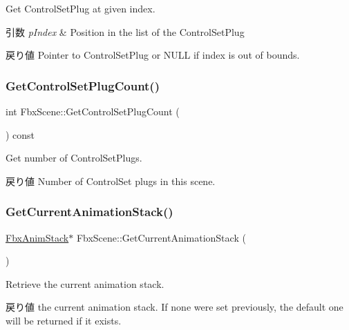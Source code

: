Get Control\+Set\+Plug at given index. 
\begin{DoxyParams}{引数}
{\em p\+Index} & Position in the list of the Control\+Set\+Plug \\
\hline
\end{DoxyParams}
\begin{DoxyReturn}{戻り値}
Pointer to Control\+Set\+Plug or {\ttfamily N\+U\+LL} if index is out of bounds. 
\end{DoxyReturn}
\mbox{\label{class_fbx_scene_a03a1a3f0153d9aa882eaa9c550fd9127}} 
\subsubsection{\texorpdfstring{Get\+Control\+Set\+Plug\+Count()}{GetControlSetPlugCount()}}
{\footnotesize\ttfamily int Fbx\+Scene\+::\+Get\+Control\+Set\+Plug\+Count (\begin{DoxyParamCaption}{ }\end{DoxyParamCaption}) const}

Get number of Control\+Set\+Plugs. \begin{DoxyReturn}{戻り値}
Number of Control\+Set plugs in this scene. 
\end{DoxyReturn}
\mbox{\label{class_fbx_scene_af8fde6643714a5e654e1e28d6f5470f9}} 
\subsubsection{\texorpdfstring{Get\+Current\+Animation\+Stack()}{GetCurrentAnimationStack()}}
{\footnotesize\ttfamily \hyperlink{class_fbx_anim_stack}{Fbx\+Anim\+Stack}$\ast$ Fbx\+Scene\+::\+Get\+Current\+Animation\+Stack (\begin{DoxyParamCaption}{ }\end{DoxyParamCaption})}

Retrieve the current animation stack. \begin{DoxyReturn}{戻り値}
the current animation stack. If none were set previously, the default one will be returned if it exists. 
\end{DoxyReturn}
\mbox{\label{class_fbx_scene_a7dd5c89cc0d60a42ce504b2593f781cb}} 

